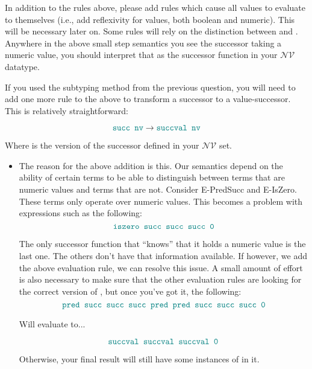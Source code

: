 \documentclass{exam}
\let\OldTexttt\texttt
\renewcommand{\texttt}[1]{\OldTexttt{\color{teal}{#1}}}
\begin{document}
In addition to the rules above, please add rules which cause all values to evaluate to themselves (i.e., add reflexivity for values, both boolean and numeric).  This will be necessary later on.  Some rules will rely on the distinction between \texttt{succ t} and \texttt{succ nv}.  Anywhere in the above small step semantics you see the successor taking a numeric value, you should interpret that as the successor function in your $\mathcal{NV}$ datatype.  

If you used the subtyping method from the previous question, you will need to add one more rule to the above to transform a successor to a value-successor.  This is relatively straightforward:

$$\texttt{succ nv} \rightarrow \texttt{succval nv}$$

Where \texttt{succval} is the version of the successor defined in your $\mathcal{NV}$ set.  

\begin{itemize}
\item The reason for the above addition is this.  Our semantics depend on the ability of certain terms to be able to distinguish between terms that are numeric values and terms that are not.  Consider E-PredSucc and E-IsZero.  These terms only operate over numeric values.  This becomes a problem with expressions such as the following:
\begin{equation}
\texttt{iszero succ succ succ 0}
\end{equation}

The only successor function that ``knows'' that it holds a numeric value is the last one. The others don't have that information available. If however, we add the above evaluation rule, we can resolve this issue.  A small amount of effort is also necessary to make sure that the other evaluation rules are looking for the correct version of \texttt{succ}, but once you've got it, the following: \\

\begin{equation}
\texttt{pred succ succ succ pred pred succ succ succ 0}
\end{equation}

Will evaluate to...

\begin{equation}
\texttt{succval succval succval 0}
\end{equation}

Otherwise, your final result will still have some instances of \texttt{pred} in it.  
\end{itemize}
\end{document}
